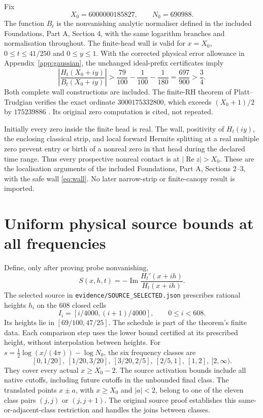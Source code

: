 \documentclass[11pt,a4paper]{article}
\theoremstyle{definition}\newtheorem{definition}[theorem]{Definition}
\theoremstyle{remark}\newtheorem{remark}[theorem]{Remark}
\newcommand{\Rea}{\operatorname{Re}}
\newcommand{\Ima}{\operatorname{Im}}
\begin{document}
Fix
\[
X_0=6000000185827,\qquad N_0=690988.
\]
The function $B_t$ is the nonvanishing analytic normaliser defined in the
included Foundations, Part A, Section 4, with the same logarithm branches
and normalisation throughout. The finite-head wall is valid for $x=X_0$, $0\le t\le41/250$ and
$0\le y\le1$. With the corrected physical error allowance in
Appendix~\ref{app:gaussian}, the unchanged ideal-prefix certificates imply
\begin{equation}\label{eq:wall}
\left|\frac{H_t(X_0+iy)}{B_t(X_0+iy)}\right|
>\frac{79}{100}-\frac1{100}-\frac1{180}
=\frac{697}{900}>\frac34.
\end{equation}
Both complete wall constructions are included. The finite-RH theorem of
Platt--Trudgian verifies the exact ordinate $3000175332800$, which exceeds
$(X_0+1)/2$ by $175239886$ \cite[Theorem 1]{pt}. Its original zero
computation is cited, not repeated.

Initially every zero inside the finite head is real. The wall, positivity
of $H_t(iy)$, the enclosing classical strip, and local forward Hermite
splitting at a real multiple zero prevent entry or birth of a nonreal zero
in that head during the declared time range. Thus every prospective
nonreal contact is at $|\Rea z|>X_0$. These are the localisation arguments
of the included Foundations, Part A, Sections 2--3, with the safe wall
\eqref{eq:wall}. No later narrow-strip or finite-canopy result is imported.

\section{Uniform physical source bounds at all frequencies}\label{sec:physical}
Define, only after proving probe nonvanishing,
\[
S(x,h,t)=-\Ima\frac{H_t'(x+ih)}{H_t(x+ih)}.
\]
The selected source in \nolinkurl{evidence/SOURCE_SELECTED.json} prescribes rational
heights $h_i$ on the 608 closed cells
\[
I_i=[i/4000,(i+1)/4000],\qquad 0\le i<608.
\]
Its heights lie in $[69/100,47/25]$. The schedule is part of the theorem's finite data. Each comparison step
uses the lower bound certified at its prescribed height, without
interpolation between heights.
For $s=\tfrac12\log(x/(4\pi))-\log N_0$, the six frequency classes are
\[
[0,1/20],\ [1/20,3/20],\ [3/20,2/5],\ [2/5,1],\ [1,2],\ [2,\infty).
\]
They cover every actual $x\ge X_0-2$. The source activation bounds include
all native cutoffs, including future cutoffs in the unbounded final class.
The translated points $x\pm a$, with $x\ge X_0$ and $|a|<2$, belong to
one of the eleven class pairs $(j,j)$ or $(j,j+1)$. The original source proof establishes this same-or-adjacent-class
restriction and handles the joins between classes.
\end{document}
